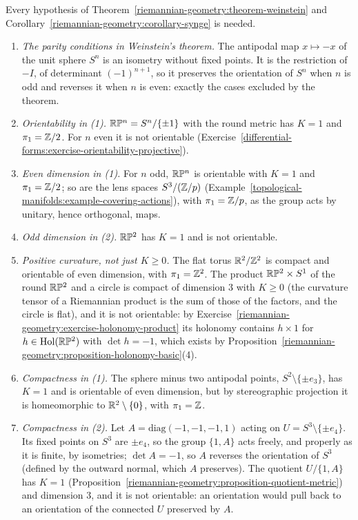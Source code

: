 \begin{counterexample}\label{riemannian-geometry:counterexample-synge}
Every hypothesis of Theorem~\ref{riemannian-geometry:theorem-weinstein} and Corollary~\ref{riemannian-geometry:corollary-synge} is needed.
\begin{enumerate}
\item \emph{The parity conditions in Weinstein's theorem.} The antipodal map $x \mapsto -x$ of the unit sphere $S^n$ is an isometry without fixed points. It is the restriction
of $-I$, of determinant $(-1)^{n+1}$, so it preserves the orientation of $S^n$ when $n$ is odd and reverses it when $n$ is even: exactly the cases excluded by the theorem.
\item \emph{Orientability in (1).} $\mathbb{R}\mathbb{P}^n = S^n/\{\pm1\}$ with the round metric has $K = 1$ and $\pi_1 = \mathbb{Z}/2$. For $n$ even it is not orientable
(Exercise~\ref{differential-forms:exercise-orientability-projective}).
\item \emph{Even dimension in (1).} For $n$ odd, $\mathbb{R}\mathbb{P}^n$ is orientable with $K = 1$ and $\pi_1 = \mathbb{Z}/2$; so are the lens spaces $S^3/(\mathbb{Z}/p)$
(Example~\ref{topological-manifolds:example-covering-actions}), with $\pi_1 = \mathbb{Z}/p$, as the group acts by unitary, hence orthogonal, maps.
\item \emph{Odd dimension in (2).} $\mathbb{R}\mathbb{P}^2$ has $K = 1$ and is not orientable.
\item \emph{Positive curvature, not just $K \geq 0$.} The flat torus $\mathbb{R}^2/\mathbb{Z}^2$ is compact and orientable of even dimension, with $\pi_1 = \mathbb{Z}^2$. The product
$\mathbb{R}\mathbb{P}^2 \times S^1$ of the round $\mathbb{R}\mathbb{P}^2$ and a circle is compact of dimension $3$ with $K \geq 0$ (the curvature tensor of a Riemannian product is the sum of those of the factors, and the circle is flat), and it is not
orientable: by Exercise~\ref{riemannian-geometry:exercise-holonomy-product} its holonomy contains $h \times 1$ for $h \in \mathrm{Hol}(\mathbb{R}\mathbb{P}^2)$ with $\det h = -1$, which
exists by Proposition~\ref{riemannian-geometry:proposition-holonomy-basic}(4).
\item \emph{Compactness in (1).} The sphere minus two antipodal points, $S^2 \setminus \{\pm e_3\}$, has $K = 1$ and is orientable of even dimension, but by stereographic
projection it is homeomorphic to $\mathbb{R}^2 \setminus \{0\}$, with $\pi_1 = \mathbb{Z}$.
\item \emph{Compactness in (2).} Let $A = \mathrm{diag}(-1, -1, -1, 1)$ acting on $U = S^3 \setminus \{\pm e_4\}$. Its fixed points on $S^3$ are $\pm e_4$, so the group
$\{1, A\}$ acts freely, and properly as it is finite, by isometries; $\det A = -1$, so $A$ reverses the orientation of $S^3$ (defined by the outward normal, which $A$
preserves). The quotient $U/\{1, A\}$ has $K = 1$ (Proposition~\ref{riemannian-geometry:proposition-quotient-metric}) and dimension $3$, and it is not orientable: an
orientation would pull back to an orientation of the connected $U$ preserved by $A$.
\end{enumerate}
\end{counterexample}

